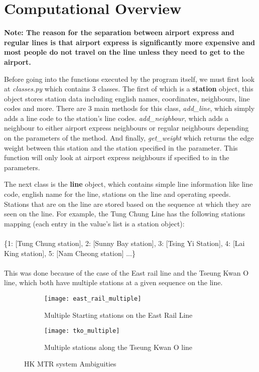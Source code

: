 \documentclass[fontsize=11pt]{article}
\begin{document}
\section*{Computational Overview}
\textbf{Note: The reason for the separation between airport express and regular lines is that airport express is significantly more expensive and most people do not travel on the line unless they need to get to the airport.} 


Before going into the functions executed by the program itself, we must first look at \textit{classes.py} which contains 3 classes. The first of which is a \textbf{station} object, this object stores station data including english names, coordinates, neighbours, line codes and more. There are 3 main methods for this class, \textit{add\_line}, which simply adds a line code to the station's line codes. \textit{add\_neighbour}, which adds a neighbour to either airport express neighbours or regular neighbours depending on the parameters of the method. And finally, \textit{get\_weight} which returns the edge weight between this station and the station specified in the parameter. This function will only look at airport express neighbours if specified to in the parameters.

The next class is the \textbf{line} object, which contains simple line information like line code, english name for the line, stations on the line and operating speeds. Stations that are on the line are stored based on the sequence at which they are seen on the line. For example, the Tung Chung Line has the following stations mapping (each entry in the value's list is a station object):\\\\ \{1: [Tung Chung station], 2: [Sunny Bay station], 3: [Tsing Yi Station], 4: [Lai King station], 5: [Nam Cheong station] ...\}\\\\
This was done because of the case of the East rail line and the Tseung Kwan O line, which both have multiple stations at a given sequence on the line. 
\begin{figure}[h]

\begin{subfigure}{0.5\textwidth}
\texttt{[image: east\_rail\_multiple]} 
\caption{Multiple Starting stations on the East Rail Line}
\label{fig:subim1}
\end{subfigure}
\begin{subfigure}{0.5\textwidth}
\texttt{[image: tko\_multiple]}
\caption{Multiple stations along the Tseung Kwan O line}
\label{fig:subim2}
\end{subfigure}

\caption{HK MTR system Ambiguities}
\label{fig:image2}
\end{figure}
\end{document}
